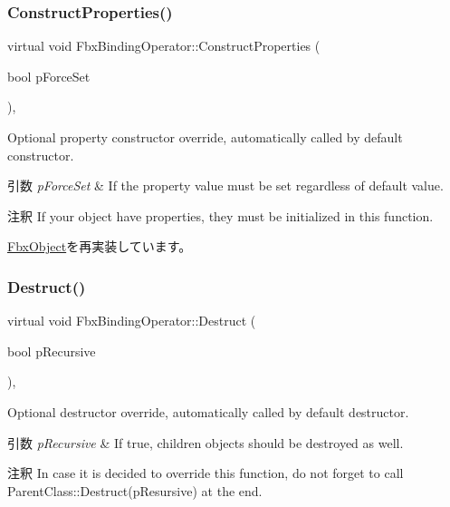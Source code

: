 \subsubsection{\texorpdfstring{Construct\+Properties()}{ConstructProperties()}}
{\footnotesize\ttfamily virtual void Fbx\+Binding\+Operator\+::\+Construct\+Properties (\begin{DoxyParamCaption}\item[{bool}]{p\+Force\+Set }\end{DoxyParamCaption})\hspace{0.3cm}{\ttfamily [protected]}, {\ttfamily [virtual]}}

Optional property constructor override, automatically called by default constructor. 
\begin{DoxyParams}{引数}
{\em p\+Force\+Set} & If the property value must be set regardless of default value. \\
\hline
\end{DoxyParams}
\begin{DoxyRemark}{注釈}
If your object have properties, they must be initialized in this function. 
\end{DoxyRemark}


\hyperlink{class_fbx_object_ad44f814323dc1b5e78bff1bfc608b4bb}{Fbx\+Object}を再実装しています。

\mbox{\label{class_fbx_binding_operator_a183d8593f526ca03661506ad1aedf412}} 
\subsubsection{\texorpdfstring{Destruct()}{Destruct()}}
{\footnotesize\ttfamily virtual void Fbx\+Binding\+Operator\+::\+Destruct (\begin{DoxyParamCaption}\item[{bool}]{p\+Recursive }\end{DoxyParamCaption})\hspace{0.3cm}{\ttfamily [protected]}, {\ttfamily [virtual]}}

Optional destructor override, automatically called by default destructor. 
\begin{DoxyParams}{引数}
{\em p\+Recursive} & If true, children objects should be destroyed as well. \\
\hline
\end{DoxyParams}
\begin{DoxyRemark}{注釈}
In case it is decided to override this function, do not forget to call Parent\+Class\+::\+Destruct(p\+Resursive) at the end. 
\end{DoxyRemark}


